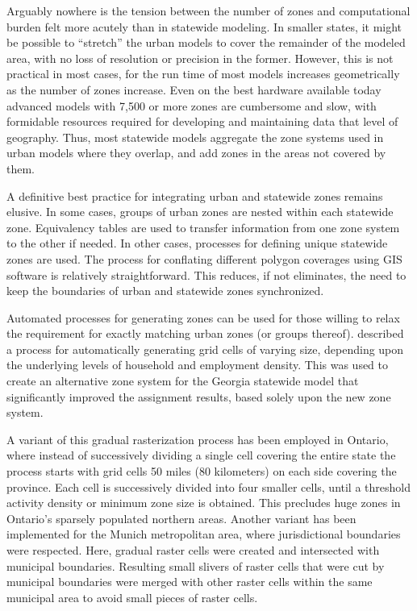 Arguably nowhere is the tension between the number of zones and computational burden felt more acutely than in statewide modeling. In smaller states, it might be possible to ``stretch'' the urban models to cover the remainder of the modeled area, with no loss of resolution or precision in the former. However, this is not practical in most cases, for the run time of most models increases geometrically as the number of zones increase. Even on the best hardware available today advanced models with 7,500 or more zones are cumbersome and slow, with formidable resources required for developing and maintaining data that level of geography. Thus, most statewide models aggregate the zone systems used in urban models where they overlap, and add zones in the areas not covered by them.

A definitive best practice for integrating urban and statewide zones remains elusive. In some cases, groups of urban zones are nested within each statewide zone. Equivalency tables are used to transfer information from one zone system to the other if needed. In other cases, processes for defining unique statewide zones are used. The process for conflating different polygon coverages using GIS software is relatively straightforward. This reduces, if not eliminates, the need to keep the boundaries of urban and statewide zones synchronized.

Automated processes for generating zones can be used for those willing to relax the requirement for exactly matching urban zones (or groups thereof). \cite{moeckel15a} described a process for automatically generating grid cells of varying size, depending upon the underlying levels of household and employment density. This was used to create an alternative zone system for the Georgia statewide model that significantly improved the assignment results, based solely upon the new zone system. 

A variant of this gradual rasterization process has been employed in Ontario, where instead of successively dividing a single cell covering the entire state the process starts with grid cells 50 miles (80 kilometers) on each side covering the province. Each cell is successively divided into four smaller cells, until a threshold activity density or minimum zone size is obtained. This precludes huge zones in Ontario's sparsely populated northern areas. Another variant has been implemented for the Munich metropolitan area, where jurisdictional boundaries were respected. Here, gradual raster cells were created and intersected with municipal boundaries. Resulting small slivers of raster cells that were cut by municipal boundaries were merged with other raster cells within the same municipal area to avoid small pieces of raster cells.

